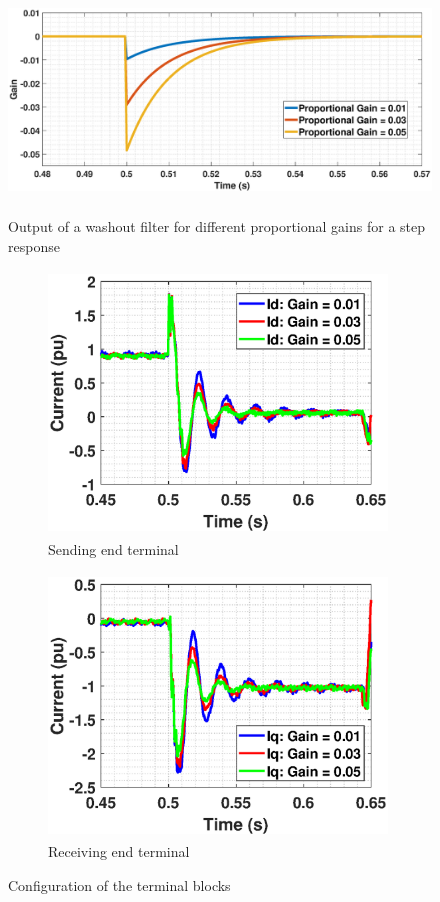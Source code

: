 \begin{figure}[H]
\centering
    \includegraphics[height = 6cm,width = 14.5cm]{Diagrams/Chapter_3/Washout_gain_output.eps}
    \caption{Output of a washout filter for different proportional gains for a step response}
    \label{fig:Washout_gain_output}
\end{figure}

\begin{figure}[H]
\centering
\begin{subfigure}{0.5\textwidth}
  \centering
  \includegraphics[height = 7cm,width = 9cm]{Diagrams/Chapter_3/ID_Washout_Comp.eps}
  \caption{Sending end terminal}
  \label{fig:CableParaBlock_sen_term}
\end{subfigure}%
\begin{subfigure}{0.5\textwidth}
  \centering
  \includegraphics[height = 7cm,width = 9cm]{Diagrams/Chapter_3/IQ_Washout_Comp.eps}
  \caption{Receiving end terminal}
  \label{fig:CableParaBlock_rec_term}
\end{subfigure}
\caption{Configuration of the terminal blocks}
\label{fig:Terminal_options}
\end{figure}

